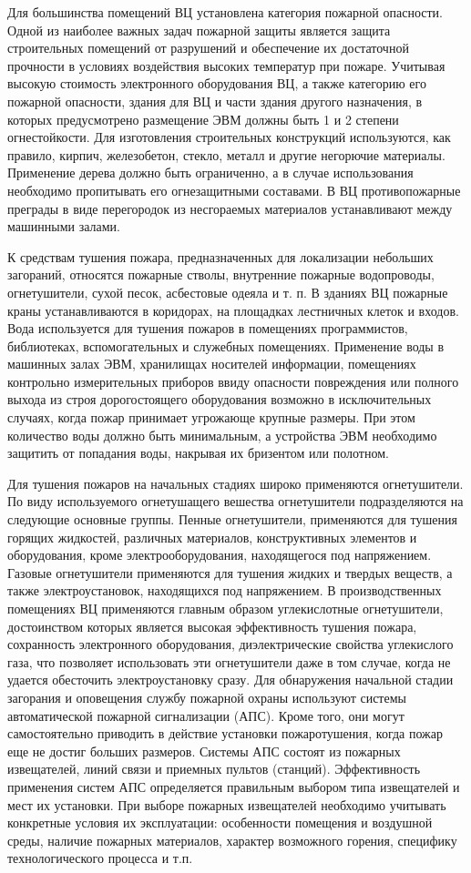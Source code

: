 Для большинства помещений ВЦ установлена категория пожарной опасности. Одной из наиболее важных задач пожарной защиты
является защита строительных помещений от разрушений и обеспечение их достаточной прочности в условиях воздействия
высоких температур при пожаре. Учитывая высокую стоимость электронного оборудования ВЦ, а также категорию его
пожарной опасности, здания для ВЦ и части здания другого назначения, в которых предусмотрено размещение ЭВМ должны
быть 1 и 2 степени огнестойкости. Для изготовления строительных конструкций используются, как правило, кирпич,
железобетон, стекло, металл и другие негорючие материалы. Применение дерева должно быть ограниченно, а в
случае использования необходимо пропитывать его огнезащитными составами. В ВЦ противопожарные преграды в виде
перегородок из несгораемых материалов устанавливают между машинными залами.

К средствам тушения пожара, предназначенных для локализации небольших загораний, относятся пожарные стволы,
внутренние пожарные водопроводы, огнетушители, сухой песок, асбестовые одеяла и т. п. В зданиях ВЦ пожарные
краны устанавливаются в коридорах, на площадках лестничных клеток и входов. Вода используется для тушения пожаров
в помещениях программистов, библиотеках, вспомогательных и служебных помещениях. Применение воды в машинных залах
ЭВМ, хранилищах носителей информации, помещениях контрольно измерительных приборов ввиду опасности повреждения или
полного выхода из строя дорогостоящего оборудования возможно в исключительных случаях, когда пожар принимает
угрожающе крупные размеры. При этом количество воды должно быть минимальным, а устройства ЭВМ необходимо защитить
от попадания воды, накрывая их бризентом или полотном.

Для тушения пожаров на начальных стадиях широко применяются огнетушители. По виду используемого огнетушащего
вешества огнетушители подразделяются на следующие основные группы. Пенные огнетушители, применяются для тушения
горящих жидкостей, различных материалов, конструктивных элементов и оборудования, кроме электрооборудования,
находящегося под напряжением. Газовые огнетушители применяются для тушения жидких и твердых веществ, а также
электроустановок, находящихся под напряжением. В производственных помещениях ВЦ применяются главным образом
углекислотные огнетушители, достоинством которых является высокая эффективность тушения пожара, сохранность
электронного оборудования, диэлектрические свойства углекислого газа, что позволяет использовать эти огнетушители
даже в том случае, когда не удается обесточить электроустановку сразу. Для обнаружения начальной стадии
загорания и оповещения службу пожарной охраны используют системы автоматической пожарной сигнализации (АПС).
Кроме того, они могут самостоятельно приводить в действие установки пожаротушения, когда пожар еще не достиг
больших размеров. Системы АПС состоят из пожарных извещателей, линий связи и приемных пультов (станций).
Эффективность применения систем АПС определяется правильным выбором типа извещателей и мест их установки.
При выборе пожарных извещателей необходимо учитывать конкретные условия их эксплуатации: особенности помещения и
воздушной среды, наличие пожарных материалов, характер возможного горения, специфику технологического процесса и т.п.

